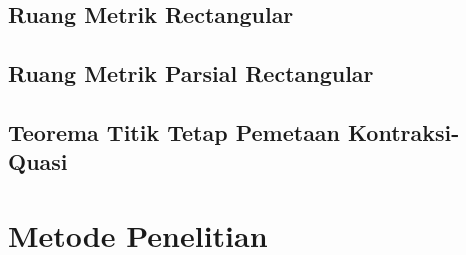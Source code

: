 \documentclass[12pt]{article}
\numberwithin{lemma}{subsection}
\begin{document}
\subsection{Ruang Metrik Rectangular}

\hskip 1cm
\subsection{Ruang Metrik Parsial Rectangular}

\hskip 0.7cm
\subsection{Teorema Titik Tetap Pemetaan Kontraksi-Quasi}
\hskip 0.7cm 



\pagebreak
\section{Metode Penelitian}
\end{document}
